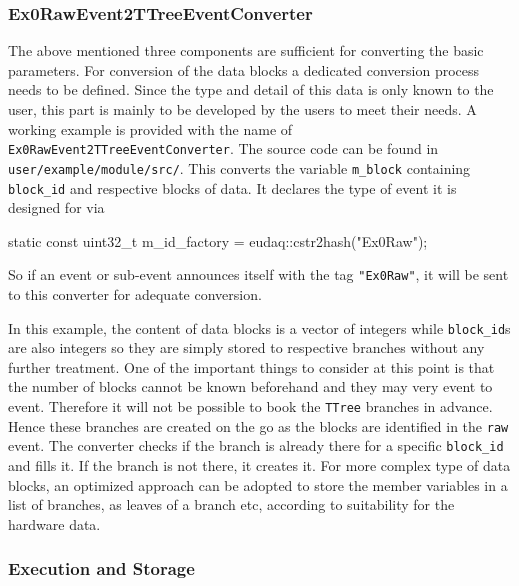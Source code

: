 \subsubsection{Ex0RawEvent2TTreeEventConverter}
The above mentioned three components are sufficient for converting the basic parameters. For conversion of the data blocks a dedicated conversion process needs to be defined. Since the type and detail of this data is only known to the user, this part is mainly to be developed by the users to meet their needs. A working example is provided with the name of \lstinline[style=cpp]{Ex0RawEvent2TTreeEventConverter}. The source code can be found in \\ \lstinline[style=cpp]{user/example/module/src/}. This converts the variable \lstinline[style=cpp]{m_block} containing \lstinline[style=cpp]{block_id} and respective blocks of data. It declares the type of event it is designed for via 
\begin{listing}[mybash]
static const uint32_t m_id_factory = eudaq::cstr2hash("Ex0Raw");
\end{listing}
So if an event or sub-event announces itself with the tag \lstinline[style=cpp]{"Ex0Raw"}, it will be sent to this converter for adequate conversion. 


In this example, the content of data blocks is a vector of integers while \lstinline[style=cpp]{block_id}s are also integers so they are simply stored to respective branches without any further treatment. One of the important things to consider at this point is that the number of blocks cannot be known beforehand and they may very event to event. Therefore it will not be possible to book the \lstinline[style=cpp]{TTree} branches in advance. Hence these branches are created on the go as the blocks are identified in the \lstinline[style=cpp]{raw} event. The converter checks if the branch is already there for a specific \lstinline[style=cpp]{block_id} and fills it. If the branch is not there, it creates it. For more complex type of data blocks, an optimized approach can be adopted to store the member variables in a list of branches, as leaves of a branch etc, according to suitability for the hardware data. 

\subsubsection{Execution and Storage}

